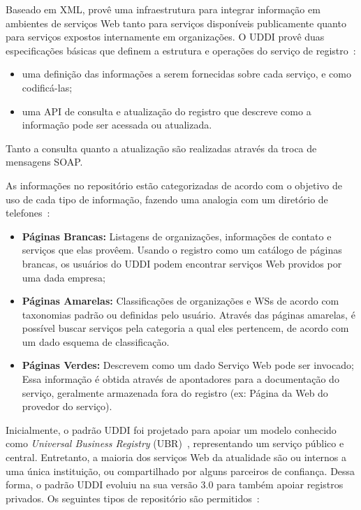 \documentclass[12pt]{report} %
\begin{document}
		Baseado em XML, provê uma infraestrutura para integrar informação em ambientes de serviços Web tanto para serviços disponíveis publicamente quanto para serviços expostos internamente em organizações.
		O UDDI provê duas especificações básicas que definem a estrutura e operações do serviço de registro~\cite{IntroWS}:
		\begin{itemize}
		    \item uma definição das informações a serem fornecidas sobre cada serviço, e como codificá-las;
		    \item uma API de consulta e atualização do registro que descreve como a informação pode ser acessada ou atualizada.
		\end{itemize}
		
		Tanto a consulta quanto a atualização são realizadas através da troca de mensagens SOAP.

		As informações no repositório estão categorizadas de acordo com o objetivo de uso de cada tipo de informação, fazendo uma analogia com um diretório de telefones~\cite{alonso2004}:
		\begin{itemize}
		    \item \textbf{Páginas Brancas:} Listagens de organizações, informações de contato e serviços que elas provêem.
			    Usando o registro como um catálogo de páginas brancas, os usuários do UDDI podem encontrar serviços Web providos por uma dada empresa;
		    \item \textbf{Páginas Amarelas:} Classificações de organizações e WSs de acordo com taxonomias padrão ou definidas pelo usuário.
			    Através das páginas amarelas, é possível buscar serviços pela categoria a qual eles pertencem, de acordo com um dado esquema de classificação.
		    \item \textbf{Páginas Verdes:} Descrevem como um dado Serviço Web pode ser invocado;
			    Essa informação é obtida através de apontadores para a documentação do serviço, geralmente armazenada fora do registro (ex: Página da Web do provedor do serviço).
		\end{itemize}

		Inicialmente, o padrão UDDI foi projetado para apoiar um modelo conhecido como \textit{Universal Business Registry} (UBR)~\cite{IntroWS}, representando um serviço público e central.
		Entretanto, a maioria dos serviços Web da atualidade são ou internos a uma única instituição, ou compartilhado por alguns parceiros de confiança.
		Dessa forma, o padrão UDDI evoluiu na sua versão 3.0 para também apoiar registros privados.
		Os seguintes tipos de repositório são permitidos~\cite{alonso2004}:
\end{document}
